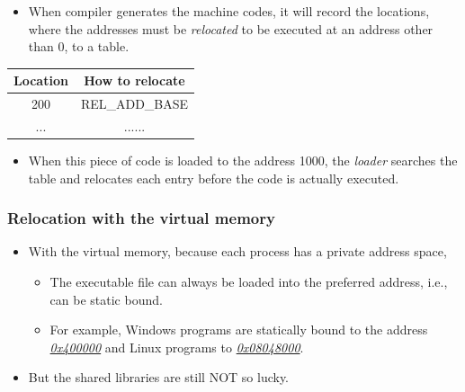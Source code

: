 \documentclass[CJKutf8,dvipsnames,table]{beamer}
\begin{document}
\begin{CJK*}{UTF8}{song}
\begin{frame}[fragile]
\begin{itemize}
    \item When compiler generates the machine codes, it will record the locations, where the addresses must be \emph{relocated} to be executed at an address other than 0, to a table.  \pause
    \end{itemize}
    \begin{minipage}[c]{0.5\textwidth}
      \begin{table}
        \centering
        \small
        \begin{tabular}{|c|c|}
          \hline
          Location & How to relocate\\
          \hline\hline
          200 & REL\_ADD\_BASE\\
          ... & ......\\
          \hline
        \end{tabular} \pause
        \normalsize
      \end{table}
    \end{minipage}%
    \begin{minipage}[c]{0.5\textwidth}
      \begin{itemize}
      \item When this piece of code is loaded to the address 1000, the \emph{loader} searches the table and relocates each entry before the code is actually executed. 
      \end{itemize}
    \end{minipage}
  \end{frame}

  \fi
  
  \begin{frame}
    \frametitle{Relocation with the virtual memory} \pause
    \begin{itemize}
    \item With the virtual memory, because each process has a private address space,  \pause
      \begin{itemize}
      \item The executable file can always be loaded into the preferred address, i.e., can be static bound.  \pause
      \item For example, Windows programs are statically bound to the address \href{https://blogs.msdn.microsoft.com/oldnewthing/20141003-00/?p=43923}{\emph{0x400000}} and Linux programs to \href{https://stackoverflow.com/questions/2966426/why-do-virtual-memory-addresses-for-linux-binaries-start-at-0x8048000}{\emph{0x08048000}}.  \pause
      \end{itemize}
    \item But the shared libraries are still NOT so lucky. 
    \end{itemize}
  \end{frame}


\end{CJK*}
\end{document}
